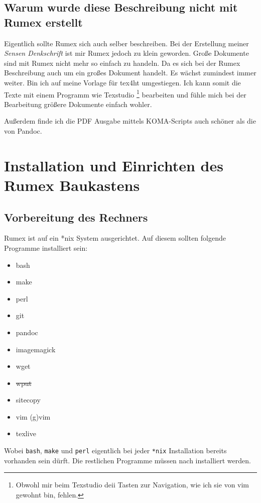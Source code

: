 \documentclass[%
fontsize=12pt,%
parskip=half,%
version=last%
]{scrreprt}
\begin{document}
\subsection{Warum wurde diese Beschreibung nicht mit Rumex erstellt}

Eigentlich sollte Rumex sich auch selber beschreiben.
Bei der Erstellung meiner \emph{Sensen Denkschrift} ist mir Rumex 
jedoch zu klein geworden. 
Große Dokumente sind mit Rumex nicht mehr so einfach zu handeln.
Da es sich bei der Rumex Beschreibung auch um ein großes Dokument handelt. Es wächst zumindest immer weiter. Bin ich auf meine Vorlage für tex4ht umgestiegen.
Ich kann somit die Texte mit einem Programm wie
Texstudio%
\footnote{Obwohl mir beim Texstudio deii Tasten zur Navigation,
wie ich sie von vim gewohnt bin, fehlen.} 
bearbeiten und fühle mich bei der Bearbeitung 
größere Dokumente einfach wohler.

Außerdem finde ich die PDF Ausgabe mittels KOMA-Scripts auch 
schöner als die von Pandoc.


\label{installation-und-einrichten-des-rumex-baukastens}
\section{Installation und Einrichten des Rumex Baukastens}

\label{vorbereitung-des-rechners}
\subsection{Vorbereitung des Rechners}

Rumex ist auf ein *nix System ausgerichtet. Auf diesem sollten folgende
Programme installiert sein:

\begin{itemize}
\item
  bash
\item
  make
\item
  perl
\item
  git
\item
  pandoc
\item
  imagemagick
\item
  wget
\item
  \sout{wput}
\item
  sitecopy
\item
  vim (g)vim
\item
  texlive
\end{itemize}

Wobei \texttt{bash}, \texttt{make} und \texttt{perl} eigentlich bei
jeder \texttt{*nix} Installation bereits vorhanden sein dürft. Die
restlichen Programme müssen nach installiert werden.
\end{document}
